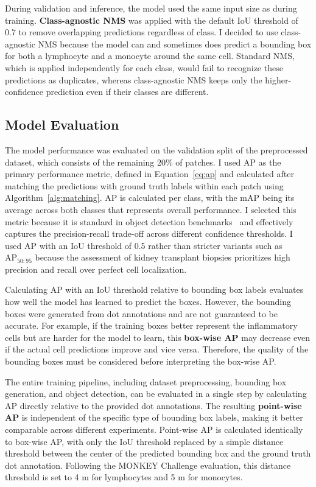 During validation and inference, the model used the same input size as during training. \textbf{Class-agnostic NMS} was applied with the default IoU threshold of 0.7 to remove overlapping predictions regardless of class. I decided to use class-agnostic NMS because the model can and sometimes does predict a bounding box for both a lymphocyte and a monocyte around the same cell. Standard NMS, which is applied independently for each class, would fail to recognize these predictions as duplicates, whereas class-agnostic NMS keeps only the higher-confidence prediction even if their classes are different.

\subsection{Model Evaluation}
The model performance was evaluated on the validation split of the preprocessed dataset, which consists of the remaining 20\% of patches. I used AP as the primary performance metric, defined in Equation~\ref{eq:ap} and calculated after matching the predictions with ground truth labels within each patch using Algorithm~\ref{alg:matching}. AP is calculated per class, with the mAP being its average across both classes that represents overall performance. I selected this metric because it is standard in object detection benchmarks~\cite{Everingham2010, Lin2014} and effectively captures the precision-recall trade-off across different confidence thresholds. I used AP with an IoU threshold of 0.5 rather than stricter variants such as $\mathrm{AP}_{50:95}$ because the assessment of kidney transplant biopsies prioritizes high precision and recall over perfect cell localization.

Calculating AP with an IoU threshold relative to bounding box labels evaluates how well the model has learned to predict the boxes. However, the bounding boxes were generated from dot annotations and are not guaranteed to be accurate. For example, if the training boxes better represent the inflammatory cells but are harder for the model to learn, this \textbf{box-wise AP} may decrease even if the actual cell predictions improve and vice versa. Therefore, the quality of the bounding boxes must be considered before interpreting the box-wise AP.

The entire training pipeline, including dataset preprocessing, bounding box generation, and object detection, can be evaluated in a single step by calculating AP directly relative to the provided dot annotations. The resulting \textbf{point-wise AP} is independent of the specific type of bounding box labels, making it better comparable across different experiments. Point-wise AP is calculated identically to box-wise AP, with only the IoU threshold replaced by a simple distance threshold between the center of the predicted bounding box and the ground truth dot annotation. Following the MONKEY Challenge evaluation, this distance threshold is set to 4 \textmu m for lymphocytes and 5 \textmu m for monocytes.

